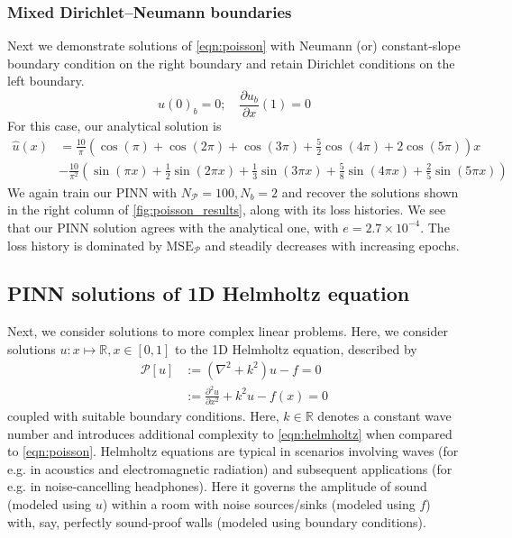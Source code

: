\documentclass[11pt]{article}
\newcommand{\mse}{\textrm{MSE}}
\newcommand{\pde}{\ensuremath{\mathcal{P}}}
\begin{document}
\subsubsection{Mixed Dirichlet--Neumann boundaries}
\label{sec:org9d68767}
Next we demonstrate solutions of \cref{eqn:poisson} with Neumann (or)
constant-slope boundary condition on the right boundary and retain Dirichlet
conditions on the left boundary.
\[ u(0)_b = 0 ;\quad \frac{\partial u_b}{\partial x}(1) = 0\]
For this case, our analytical solution is
\begin{equation}
	\begin{aligned}
	 \hat{u}(x) &= \frac{10}{\pi}\left(\cos(\pi) + \cos(2\pi) + \cos(3\pi) + \frac{5}{2}\cos(4\pi) + 2\cos(5\pi)\right)x \\
	 & - \frac{10}{\pi^2} \left(\sin(\pi x) + \frac{1}{2}\sin(2\pi x) + \frac{1}{3}\sin(3\pi x) + \frac{5}{8}\sin(4\pi
	 x) + \frac{2}{5}\sin(5\pi x)\right)
	\end{aligned}
\end{equation}
We again train our PINN with \(N_\pde = 100 , N_b = 2\) and recover the solutions
shown in the right column of \cref{fig:poisson_results}, along with its loss
histories. We see that our PINN solution agrees with the analytical one,
with \(e = 2.7 \times 10^{-4}\). The loss history is dominated by \(\mse_\pde\) and steadily decreases with increasing epochs.

\subsection{PINN solutions of 1D Helmholtz equation}
\label{sec:helmholtz}
Next, we consider solutions to more complex linear problems. Here, we
consider solutions \(u : x \mapsto \mathbb{R}, x \in [0, 1]\) to the 1D Helmholtz equation, described by
\begin{equation}
\label{eqn:helmholtz}
\begin{aligned}
	\pde[ u ] &:= \left(\nabla^2 + k^2 \right) u - f = 0 \\
	   		  &:= \frac{\partial^2 u}{\partial x^2} + k^2 u - f(x) = 0
\end{aligned}
\end{equation}
coupled with suitable boundary conditions. Here, \(k \in \mathbb{R}\)
denotes a constant wave number and introduces additional
complexity to \cref{eqn:helmholtz} when compared to \cref{eqn:poisson}. Helmholtz equations
are typical in scenarios
involving waves (for e.g. in acoustics and electromagnetic radiation) and
subsequent applications (for e.g. in noise-cancelling headphones). Here
it governs the amplitude of sound (modeled using \(u\)) within a room with noise
sources/sinks (modeled using \(f\)) with, say, perfectly sound-proof walls
(modeled using boundary conditions).
\end{document}

